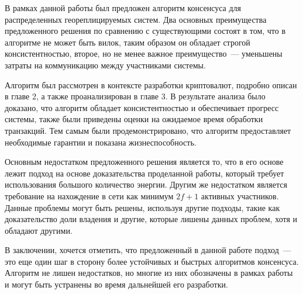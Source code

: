 В рамках данной работы был предложен алгоритм консенсуса для распределенных геореплицируемых систем.
Два основных преимущества предложенного решения по сравнению с существующими состоят в том, что в алгоритме не может быть вилок, таким образом он обладает строгой консистентностью, второе, но не менее важное преимущество~--- уменьшены затраты на коммуникацию между участниками системы.

Алгоритм был рассмотрен в контексте разработки криптовалют, подробно описан в главе 2, а также проанализирован в главе 3. В результате анализа было доказано, что алгоритм обладает консистентностью и обеспечивает прогресс системы, также были приведены оценки на ожидаемое время обработки транзакций. Тем самым были продемонстрировано, что алгоритм предоставляет необходимые гарантии и показана жизнеспособность.

Основным недостатком предложенного решения является то, что в его основе лежит подход на основе доказательства проделанной работы, который требует использования большого количество энергии. Другим же недостатком является требование на нахождение в сети как минимум $2f+1$ активных участников. Данные проблемы могут быть решены, используя другие подходы, такие как доказательство доли владения и другие, которые лишены данных проблем, хотя и обладают другими.

В заключении, хочется отметить, что предложенный в данной работе подход~--- это еще один шаг в сторону более устойчивых и быстрых алгоритмов консенсуса. Алгоритм не лишен недостатков, но многие из них обозначены в рамках работы и могут быть устранены во время дальнейшей его разработки.